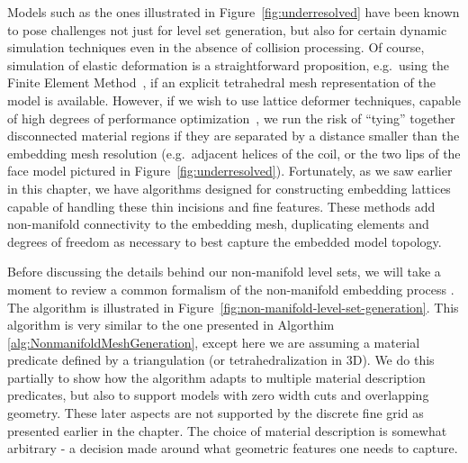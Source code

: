 Models such as the ones illustrated in Figure~\ref{fig:underresolved}
have been known to pose challenges not just for level set generation,
but also for certain dynamic simulation techniques even in the absence
of collision processing. Of course, simulation of elastic deformation
is a straightforward proposition, e.g.\ using the Finite Element
Method~\citep{SifakB:2012}, if an explicit tetrahedral mesh
representation of the model is available. However, if we wish to use
lattice deformer techniques, capable of high degrees of performance
optimization~\citep{RiverJ:2007,McAdaZSETTS:2011,MitchCS:2015}, we run
the risk of ``tying'' together disconnected material regions if they
are separated by a distance smaller than the embedding mesh resolution
(e.g.\ adjacent helices of the coil, or the two lips of the face model
pictured in Figure~\ref{fig:underresolved}). Fortunately, as we saw
earlier in this chapter, we have algorithms designed for constructing
embedding lattices capable of handling these thin incisions and fine
features. These methods add non-manifold connectivity to the embedding
mesh, duplicating elements and degrees of freedom as necessary to best
capture the embedded model topology.


Before discussing the details behind our non-manifold level sets, we
will take a moment to review a common formalism of the non-manifold
embedding process \citep{SifakDF:2007}. The algorithm is illustrated in
Figure~\ref{fig:non-manifold-level-set-generation}. This algorithm is
very similar to the one presented in Algorthim
\ref{alg:NonmanifoldMeshGeneration}, except here we are assuming a
material predicate defined by a triangulation (or tetrahedralization
in 3D). We do this partially to show how the algorithm adapts to
multiple material description predicates, but also to support models
with zero width cuts and overlapping geometry. These later aspects are
not supported by the discrete fine grid as presented earlier in the
chapter. The choice of material description is somewhat arbitrary - a
decision made around what geometric features one needs to capture. 

